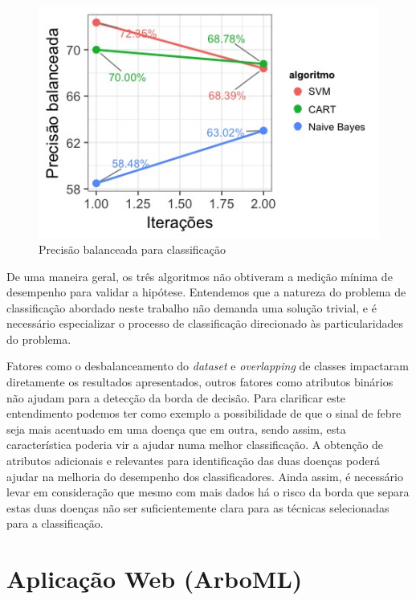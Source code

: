 \begin{figure}[htb]
  \caption{\label{fig:precisoesbalanceadas}Precisão balanceada para classificação}
  \begin{center}
    \includegraphics[scale=0.7]{imagens/atributos_selecao_desempenho_linhas.jpeg}
  \end{center}
\end{figure}

De uma maneira geral, os três algoritmos não obtiveram a medição  mínima de desempenho para validar a hipótese. Entendemos que a natureza do problema de classificação abordado neste trabalho não demanda uma solução trivial, e é necessário especializar o processo de classificação direcionado às particularidades do problema.

Fatores como o desbalanceamento do \textit{dataset} e \textit{overlapping} de classes impactaram diretamente os resultados apresentados, outros fatores como atributos binários não ajudam para a detecção da borda de decisão. Para clarificar este entendimento podemos ter como exemplo a possibilidade de que o sinal de febre seja mais acentuado em uma doença que em outra, sendo assim, esta característica poderia vir a ajudar numa melhor classificação. A obtenção de atributos adicionais e relevantes para identificação  das  duas doenças poderá ajudar na melhoria do desempenho  dos classificadores. Ainda assim, é necessário levar em consideração que mesmo com mais dados há o risco da borda que separa estas duas doenças não ser suficientemente clara para as técnicas selecionadas para a classificação.

\section{Aplicação Web (ArboML)}

